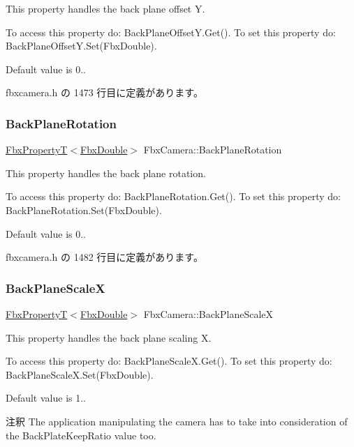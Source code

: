 This property handles the back plane offset Y.

To access this property do\+: Back\+Plane\+Offset\+Y.\+Get(). To set this property do\+: Back\+Plane\+Offset\+Y.\+Set(\+Fbx\+Double).

Default value is 0.. 

 fbxcamera.\+h の 1473 行目に定義があります。

\mbox{\label{class_fbx_camera_a25d0defefe7a7c69ee9fddfc8ea51036}} 
\subsubsection{\texorpdfstring{Back\+Plane\+Rotation}{BackPlaneRotation}}
{\footnotesize\ttfamily \hyperlink{class_fbx_property_t}{Fbx\+PropertyT}$<$\hyperlink{fbxtypes_8h_a171e72a1c46fc15c1a6c9c31948c1c5b}{Fbx\+Double}$>$ Fbx\+Camera\+::\+Back\+Plane\+Rotation}

This property handles the back plane rotation.

To access this property do\+: Back\+Plane\+Rotation.\+Get(). To set this property do\+: Back\+Plane\+Rotation.\+Set(\+Fbx\+Double).

Default value is 0.. 

 fbxcamera.\+h の 1482 行目に定義があります。

\mbox{\label{class_fbx_camera_a34ab778778521406789a1798451791db}} 
\subsubsection{\texorpdfstring{Back\+Plane\+ScaleX}{BackPlaneScaleX}}
{\footnotesize\ttfamily \hyperlink{class_fbx_property_t}{Fbx\+PropertyT}$<$\hyperlink{fbxtypes_8h_a171e72a1c46fc15c1a6c9c31948c1c5b}{Fbx\+Double}$>$ Fbx\+Camera\+::\+Back\+Plane\+ScaleX}

This property handles the back plane scaling X.

To access this property do\+: Back\+Plane\+Scale\+X.\+Get(). To set this property do\+: Back\+Plane\+Scale\+X.\+Set(\+Fbx\+Double).

Default value is 1.. \begin{DoxyRemark}{注釈}
The application manipulating the camera has to take into consideration of the Back\+Plate\+Keep\+Ratio value too. 
\end{DoxyRemark}


